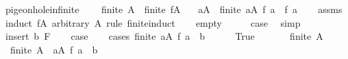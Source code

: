 \begin{isabellebody}
\endisatagproof
{\isafoldproof}%
%
\isadelimproof
\isanewline
%
\endisadelimproof
\isanewline
{}\isamarkupfalse%
\ pigeonhole{\isacharunderscore}{\kern0pt}infinite{\isacharcolon}{\kern0pt}\isanewline
\ \ \ {\isachardoublequoteopen}{\isasymnot}\ finite\ A{\isachardoublequoteclose}\ \ {\isachardoublequoteopen}finite\ {\isacharparenleft}{\kern0pt}f{\isacharbackquote}{\kern0pt}A{\isacharparenright}{\kern0pt}{\isachardoublequoteclose}\isanewline
\ \ \ {\isachardoublequoteopen}{\isasymexists}a{}{\isasymin}A{\isachardot}{\kern0pt}\ {\isasymnot}\ finite\ {\isacharbraceleft}{\kern0pt}a{\isasymin}A{\isachardot}{\kern0pt}\ f\ a\ {\isacharequal}{\kern0pt}\ f\ a{}{\isacharbraceright}{\kern0pt}{\isachardoublequoteclose}\isanewline
%
\isadelimproof
\ \ %
\endisadelimproof
%
\isatagproof
{}\isamarkupfalse%
\ assms{\isacharparenleft}{\kern0pt}{}{\isacharcomma}{\kern0pt}{}{\isacharparenright}{\kern0pt}\isanewline
{}\isamarkupfalse%
\ {\isacharparenleft}{\kern0pt}induct\ {\isachardoublequoteopen}f{\isacharbackquote}{\kern0pt}A{\isachardoublequoteclose}\ arbitrary{\isacharcolon}{\kern0pt}\ A\ rule{\isacharcolon}{\kern0pt}\ finite{\isacharunderscore}{\kern0pt}induct{\isacharparenright}{\kern0pt}\isanewline
\ \ \isamarkupfalse%
\ empty\isanewline
\ \ \isamarkupfalse%
\ \isamarkupfalse%
\ {\isacharquery}{\kern0pt}case\ \isamarkupfalse%
\ simp\isanewline
{}\isamarkupfalse%
\isanewline
\ \ \isamarkupfalse%
\ {\isacharparenleft}{\kern0pt}insert\ b\ F{\isacharparenright}{\kern0pt}\isanewline
\ \ \isamarkupfalse%
\ {\isacharquery}{\kern0pt}case\isanewline
\ \ \isamarkupfalse%
\ {\isacharparenleft}{\kern0pt}cases\ {\isachardoublequoteopen}finite\ {\isacharbraceleft}{\kern0pt}a{\isasymin}A{\isachardot}{\kern0pt}\ f\ a\ {\isacharequal}{\kern0pt}\ b{\isacharbraceright}{\kern0pt}{\isachardoublequoteclose}{\isacharparenright}{\kern0pt}\isanewline
\ \ \ \ \isamarkupfalse%
\ True\isanewline
\ \ \ \ \isamarkupfalse%
\ {\isacartoucheopen}{\isasymnot}\ finite\ A{\isacartoucheclose}\ \isamarkupfalse%
\ {\isachardoublequoteopen}{\isasymnot}\ finite\ {\isacharparenleft}{\kern0pt}A\ {\isacharminus}{\kern0pt}\ {\isacharbraceleft}{\kern0pt}a{\isasymin}A{\isachardot}{\kern0pt}\ f\ a\ {\isacharequal}{\kern0pt}\ b{\isacharbraceright}{\kern0pt}{\isacharparenright}{\kern0pt}{\isachardoublequoteclose}\isanewline

\end{isabellebody}
